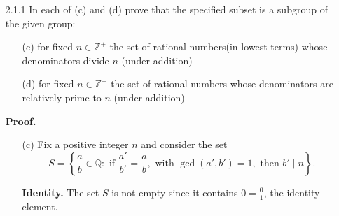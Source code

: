 \documentclass[9pt]{article}
\newcommand{\Z}{\mathbb{Z}}
\newcommand{\Q}{\mathbb{Q}}
\begin{document}
\begin{enumerate}
   \item[2.1.1]   In each of (c) and (d) prove that the specified subset is a
                  subgroup of the given group:
                  \begin{enumerate}
                     \item[(c)]  for fixed $n \in \Z^+$ the set of rational 
                                 numbers(in lowest terms) whose denominators 
                                 divide $n$ (under addition)
                     \item[(d)]  for fixed $n \in \Z^+$ the set of rational 
                                 numbers whose denominators are relatively prime 
                                 to $n$ (under addition)
                  \end{enumerate}
                  
      \textbf{Proof.}
      
      \begin{enumerate}
         \item[(c)]
               Fix a positive integer $n$ and consider the set
               $$S = \left\{\frac{a}{b} \in
               \Q : \text{ if } \frac{a'}{b'} = \frac{a}{b},
               \text{ with }\gcd(a', b') = 1, \text{ then } b' \mid n\right\}.$$

               \textbf{Identity.} The set $S$ is not empty since it contains
               $0=\frac{0}{1}$, the identity element.
               

\end{enumerate}
\end{enumerate}
\end{document}
